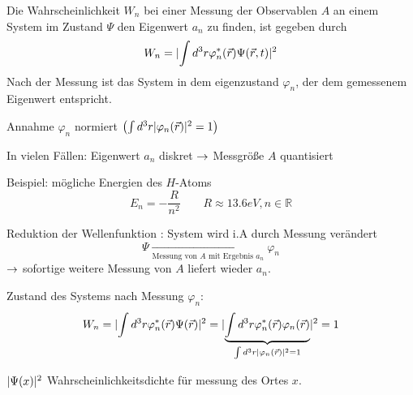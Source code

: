 Die Wahrscheinlichkeit $W_n$ bei einer Messung der Observablen $A$ an einem
System im Zustand $\Psi$ den Eigenwert $a_n$ zu finden, ist gegeben durch
\begin{equation*}
    W_n = \lvert \int d^3 r \varphi_n^*(\vec{r}) \Psi(\vec{r},t)\rvert^2
\end{equation*}
Nach der Messung ist das System in dem eigenzustand $\varphi_n$, der dem
gemessenem Eigenwert entspricht.
\begin{bem}
    \item 
    Annahme $\varphi_n$ normiert $\left( \int d^3 r \lvert \varphi_n
    (\vec{r})\rvert^2 =1 \right)$
    \item
    In vielen Fällen: Eigenwert $a_n$ diskret $\rightarrow$ Messgröße $A$ quantisiert

    Beispiel: mögliche Energien des $H$-Atoms
    \begin{equation*}
        E_n = - \frac{R}{n^2} \qquad R \approx 13.6eV, n \in \mathbb{R}
    \end{equation*}
    \item{Reduktion der Wellenfunktion}
    \QM: System wird i.A durch Messung verändert
    \begin{equation*}
        \Psi \xrightarrow[\text{Messung von $A$ mit Ergebnis $a_n$}]{} \varphi_n
    \end{equation*}
    $\rightarrow$ sofortige weitere Messung von $A$ liefert wieder $a_n$.

    Zustand des Systems nach Messung $\varphi_n$:
    \begin{equation*}
        W_n = \lvert \int d^3 r \varphi_n^*(\vec{r}) \Psi(\vec{r}) \rvert^2
            = \lvert \underbrace{\int d^3 r \varphi_n^*(\vec{r}) 
                        \varphi_n(\vec{r})}_{\int d^3 r \lvert \varphi_n
                        (\vec{r}) \rvert^2 = 1} \rvert^2= 1
    \end{equation*}
    \item
    $\lvert \Psi(x)\rvert^2$ Wahrscheinlichkeitsdichte für messung des Ortes $x$.


\end{bem}
